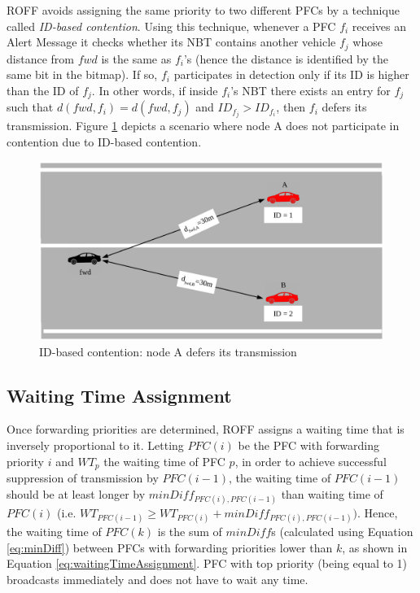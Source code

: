 			
			ROFF avoids assigning the same priority to two different PFCs by a technique called \textit{ID-based contention}. Using this technique, whenever a PFC $f_i$ receives an Alert Message it checks whether its NBT contains another vehicle $f_j$ whose distance from $fwd$ is the same as $f_i$'s (hence the distance is identified by the same bit in the bitmap). If so, $f_i$ participates in detection only if its ID is higher than the ID of $f_j$. In other words, if inside $f_i$'s NBT there exists an entry for $f_j$ such that $d(fwd, f_i) = d(fwd, f_j)$ and $ID_{f_j} > ID_{f_i}$, then $f_i$ defers its transmission. Figure \ref{fig:idBasedContention} depicts a scenario where node A does not participate in contention due to ID-based contention.
	
			\begin{figure}[H]
				\centering
				\includegraphics[width=\textwidth]{immagini/idBasedContention}
				\caption{ID-based contention: node A defers its transmission}
				\label{fig:idBasedContention}
			\end{figure}
		
		\subsection{Waiting Time Assignment}
			Once forwarding priorities are determined, ROFF assigns a waiting time that is inversely proportional to it. Letting $PFC(i)$ be the PFC with forwarding priority $i$ and $WT_p$ the waiting time of PFC $p$, in order to achieve successful suppression of transmission by $PFC(i-1)$, the waiting time of $PFC(i-1)$ should be at least longer by $minDiff_{PFC(i), PFC(i-1)}$ than waiting time of $PFC(i)$ (i.e. $WT_{PFC(i-1)} \geq WT_{PFC(i)} + minDiff_{PFC(i), PFC(i-1)})$. Hence, the waiting time of $PFC(k)$ is the sum of $minDiff$s (calculated using Equation \ref{eq:minDiff}) between PFCs with forwarding priorities lower than $k$, as shown in Equation \ref{eq:waitingTimeAssignment}. PFC with top priority (being equal to 1) broadcasts immediately and does not have to wait any time.
			
